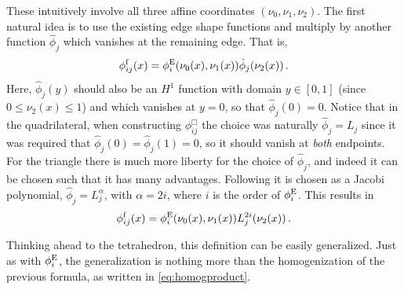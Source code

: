 These intuitively involve all three affine coordinates $(\nu_0,\nu_1,\nu_2)$.%
The first natural idea is to use the existing edge shape functions and multiply by another function $\hat{\phi}_j$ which vanishes at the remaining edge.
That is,
\begin{equation*}
	\phi_{ij}^\mathrm{f}(x)=\phi^{\mathrm{E}}_i(\nu_0(x),\nu_1(x))\hat{\phi}_j(\nu_2(x))\,.
\end{equation*}
Here, $\hat{\phi}_j(y)$ should also be an $H^1$ function with domain $y\in[0,1]$ (since $0\leq\nu_2(x)\leq1$) and which vanishes at $y=0$, so that $\hat{\phi}_j(0)=0$. 
Notice that in the quadrilateral, when constructing $\phi_{ij}^\Box$ the choice was naturally $\hat{\phi}_j=L_j$ since it was required that $\hat{\phi}_j(0)=\hat{\phi}_j(1)=0$, so it should vanish at \textit{both} endpoints. 
For the triangle there is much more liberty for the choice of $\hat{\phi}_j$, and indeed it can be chosen such that it has many advantages. 
Following \citet{Beuchler_Schoeberl_06} it is chosen as a Jacobi polynomial, $\hat{\phi}_j=L_j^\alpha$, with $\alpha=2i$, where $i$ is the order of $\phi^{\mathrm{E}}_i$. This results in
\begin{equation*}
	\phi_{ij}^\mathrm{f}(x)=\phi^{\mathrm{E}}_i(\nu_0(x),\nu_1(x))L_j^{2i}(\nu_2(x))\,.
\end{equation*}

Thinking ahead to the tetrahedron, this definition can be easily generalized. Just as with $\phi_i^{\mathrm{E}}$, the generalization is nothing more than the homogenization of the previous formula, as written in \eqref{eq:homogproduct}.%

